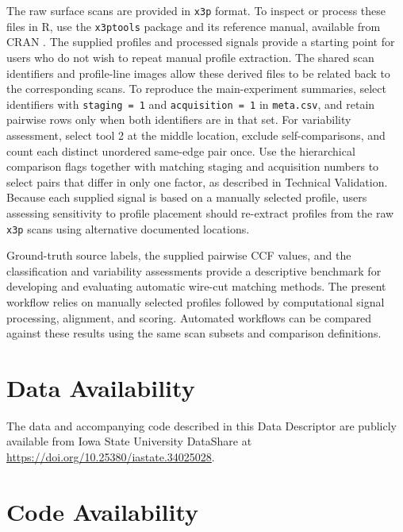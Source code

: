 \documentclass[11pt,a4paper]{article}
\begin{document}
The raw surface scans are provided in \texttt{x3p} format. To inspect or
process these files in R, use the \texttt{x3ptools} package and its
reference manual, available from CRAN
\citep{hofmannX3ptoolsToolsWorking2018}. The supplied profiles and
processed signals provide a starting point for users who do not wish to
repeat manual profile extraction. The shared scan identifiers and
profile-line images allow these derived files to be related back to the
corresponding scans. To reproduce the main-experiment summaries, select
identifiers with \texttt{staging = 1} and \texttt{acquisition = 1} in
\texttt{meta.csv}, and retain pairwise rows only when both identifiers
are in that set. For variability assessment, select tool 2 at the middle
location, exclude self-comparisons, and count each distinct unordered
same-edge pair once. Use the hierarchical comparison flags together with
matching staging and acquisition numbers to select pairs that differ in
only one factor, as described in Technical Validation. Because each
supplied signal is based on a manually selected profile, users assessing
sensitivity to profile placement should re-extract profiles from the raw
\texttt{x3p} scans using alternative documented locations.

Ground-truth source labels, the supplied pairwise CCF values, and the
classification and variability assessments provide a descriptive
benchmark for developing and evaluating automatic wire-cut matching
methods. The present workflow relies on manually selected profiles
followed by computational signal processing, alignment, and scoring.
Automated workflows can be compared against these results using the same
scan subsets and comparison definitions.

\section*{Data Availability}\label{sec-data-availability}

The data and accompanying code described in this Data Descriptor are
publicly available from Iowa State University DataShare
\citep{DatasetCodeThreedimensionalDataWirecut} at
\url{https://doi.org/10.25380/iastate.34025028}.

\section*{Code Availability}\label{sec-code-availability}
\end{document}
